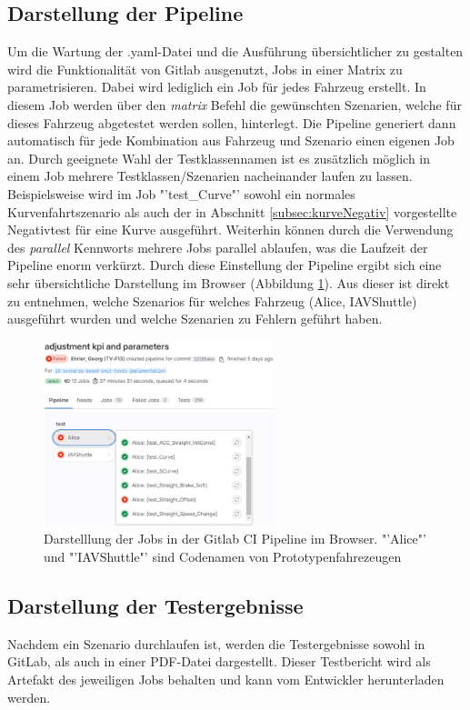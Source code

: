 \subsection{Darstellung der Pipeline}
Um die Wartung der .yaml-Datei und die Ausführung übersichtlicher zu gestalten wird die Funktionalität von Gitlab ausgenutzt, Jobs in einer Matrix zu parametrisieren. Dabei wird lediglich ein Job für jedes Fahrzeug erstellt. In diesem Job werden über den \textit{matrix} Befehl die gewünschten Szenarien, welche für dieses Fahrzeug abgetestet werden sollen, hinterlegt. Die Pipeline generiert dann automatisch für jede Kombination aus Fahrzeug und Szenario einen eigenen Job an. Durch geeignete Wahl der Testklassennamen ist es zusätzlich möglich in einem Job mehrere Testklassen/Szenarien nacheinander laufen zu lassen. Beispielsweise wird im Job "'test\_Curve"' sowohl ein normales Kurvenfahrtszenario als auch der in Abschnitt \ref{subsec:kurveNegativ} vorgestellte Negativtest für eine Kurve ausgeführt. Weiterhin können durch die Verwendung des \textit{parallel} Kennworts mehrere Jobs parallel ablaufen, was die Laufzeit der Pipeline enorm verkürzt. Durch diese Einstellung der Pipeline ergibt sich eine sehr übersichtliche Darstellung im Browser (Abbildung \ref{fig:uebersicht_pipeline}). Aus dieser ist direkt zu entnehmen, welche Szenarios für welches Fahrzeug (Alice, IAVShuttle) ausgeführt wurden und welche Szenarien zu Fehlern geführt haben.
\begin{figure}[ht]
    \centering
    \includegraphics[width=0.6\textwidth]{figures/3_Implementierung/uebersicht_pipeline.png}
    \caption{Darstelllung der Jobs in der Gitlab CI Pipeline im Browser. "'Alice"' und "'IAVShuttle"' sind Codenamen von Prototypenfahrezeugen}
    \label{fig:uebersicht_pipeline}
\end{figure}

\subsection{Darstellung der Testergebnisse}
Nachdem ein Szenario durchlaufen ist, werden die Testergebnisse sowohl in GitLab, als auch in einer PDF-Datei dargestellt. Dieser Testbericht wird als Artefakt des jeweiligen Jobs behalten und kann vom Entwickler herunterladen werden.

